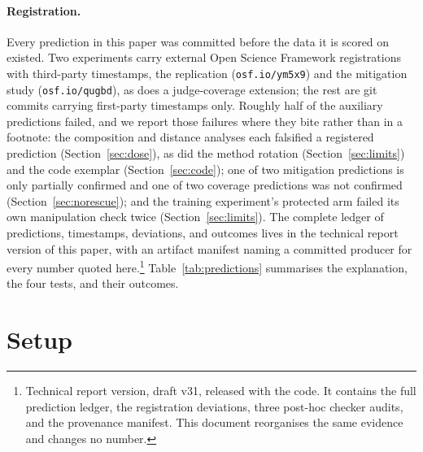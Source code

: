 \documentclass[11pt]{article}
\begin{document}
\paragraph{Registration.}
Every prediction in this paper was committed before the data it is scored on existed.
Two experiments carry external Open Science Framework registrations with third-party timestamps, the replication (\texttt{osf.io/ym5x9}) and the mitigation study (\texttt{osf.io/qugbd}), as does a judge-coverage extension; the rest are git commits carrying first-party timestamps only.
Roughly half of the auxiliary predictions failed, and we report those failures where they bite rather than in a footnote: the composition and distance analyses each falsified a registered prediction (Section~\ref{sec:dose}), as did the method rotation (Section~\ref{sec:limits}) and the code exemplar (Section~\ref{sec:code}); one of two mitigation predictions is only partially confirmed and one of two coverage predictions was not confirmed (Section~\ref{sec:norescue}); and the training experiment's protected arm failed its own manipulation check twice (Section~\ref{sec:limits}).
The complete ledger of predictions, timestamps, deviations, and outcomes lives in the technical report version of this paper, with an artifact manifest naming a committed producer for every number quoted here.\footnote{Technical report version, draft v31, released with the code. It contains the full prediction ledger, the registration deviations, three post-hoc checker audits, and the provenance manifest. This document reorganises the same evidence and changes no number.}
Table~\ref{tab:predictions} summarises the explanation, the four tests, and their outcomes.

\section{Setup}
\label{sec:setup}
\end{document}
